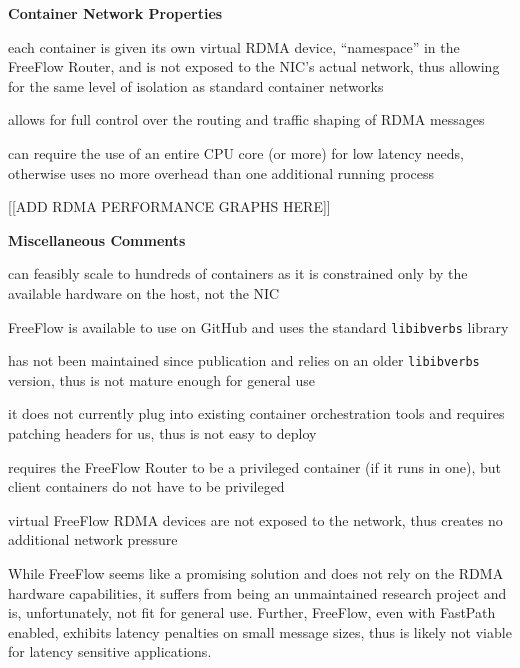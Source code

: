 \documentclass[12pt,titlepage]{article}
\begin{document}
\noindent
\textbf{Container Network Properties}
\begin{description}[nolistsep,font={{\scshape\bfseries}}]
	\item[Network Isolation] each container is given its own virtual RDMA device, ``namespace'' in the FreeFlow Router, and is not exposed to the NIC's actual network, thus allowing for the same level of isolation as standard container networks
	\item[Controllability] allows for full control over the routing and traffic shaping of RDMA messages
	\item[Resource Utilization] can require the use of an entire CPU core (or more) for low latency needs, otherwise uses no more overhead than one additional running process
\end{description}

[[ADD RDMA PERFORMANCE GRAPHS HERE]]

\noindent
\textbf{Miscellaneous Comments}
\begin{description}[nolistsep,font={{\scshape\bfseries}}]
	\item[Scalability Limits] can feasibly scale to hundreds of containers as it is constrained only by the available hardware on the host, not the NIC
	\item[Proprietary] FreeFlow is available to use on GitHub and uses the standard \texttt{libibverbs} library
	\item[Maturity] has not been maintained since publication and relies on an older \texttt{libibverbs} version, thus is not mature enough for general use
	\item[Ease in Deployment] it does not currently plug into existing container orchestration tools and requires patching headers for us, thus is not easy to deploy
	\item[Execution Privileges] requires the FreeFlow Router to be a privileged container (if it runs in one), but client containers do not have to be privileged
	\item[Network Pressure] virtual FreeFlow RDMA devices are not exposed to the network, thus creates no additional network pressure
\end{description}

While FreeFlow seems like a promising solution and does not rely on the RDMA hardware capabilities, it suffers from being an unmaintained research project and is, unfortunately, not fit for general use.
Further, FreeFlow, even with FastPath enabled, exhibits latency penalties on small message sizes, thus is likely not viable for latency sensitive applications.
\end{document}
